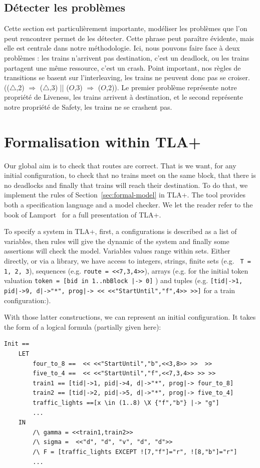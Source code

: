 \documentclass[runningheads]{llncs}
\begin{document}
\subsection{Détecter les problèmes}
Cette section est particulièrement importante, modéliser les problèmes que l'on peut rencontrer permet de les détecter.
Cette phrase peut paraître évidente, mais elle est centrale dans notre méthodologie. Ici, nous pouvons faire face à deux problèmes : 
les trains n'arrivent pas destination, c'est un deadlock, ou les trains partagent une même ressource, c'est un crash. 
Point important, nos règles de transitions se basent sur l'interleaving, les trains ne peuvent donc pas se croiser. (($\triangle$,2) $\Rightarrow$ ($\triangle$,3) || ($O$,3) $\Rightarrow$ ($O$,2)).
Le premier problème représente notre propriété de Liveness, les trains arrivent à destination, et le second représente notre propriété de Safety, les trains ne se crashent pas.

\section{Formalisation within TLA+}
\label{sec:tla-formalisation}

Our global aim is to check that routes are correct. That is we want, for any initial configuration, to check that no trains meet on the same block, that there is no deadlocks and finally  that trains will reach their destination. To do that, we implement the rules of Section~\ref{sec:formal-model} in TLA+. The tool provides both a specification language and a model checker. We let the reader refer to the book of Lamport~\cite{Lamport} for a full presentation of TLA+. 

To specify a system in TLA+, first, a configurations is described as a list of variables, then rules  will give the dynamic of the system and finally some assertions  will check the model.  Variables values range within sets. Either directly, or via a library, we have access to integers, strings, finite sets (e.g. \texttt{ T = {1, 2, 3}}), sequences (e.g. \texttt{route = <<7,3,4>>}),  arrays (e.g. for the initial token valuation \texttt{token = [bid in 1..nbBlock |-> 0]} ) and tuples (e.g. \texttt{[tid|->1, pid|->9, d|->"*", prog|-> << <<"StartUntil","f",4>> >>]}  for a train configuration:).

With those latter constructions, we can represent an initial configuration. It takes the form of a logical formula (partially given here):
\begin{verbatim}
Init == 
    LET 
        four_to_8 ==  << <<"StartUntil","b",<<3,8>> >>  >>
        five_to_4 ==  << <<"StartUntil","f",<<7,3,4>> >> >>
        train1 == [tid|->1, pid|->4, d|->"*", prog|-> four_to_8]
        train2 == [tid|->2, pid|->5, d|->"*", prog|-> five_to_4]
        traffic_lights ==[x \in (1..8) \X {"f","b"} |-> "g"]
        ...
    IN
        /\ gamma = <<train1,train2>>
        /\ sigma =  <<"d", "d", "v", "d", "d">> 
        /\ F = [traffic_lights EXCEPT ![7,"f"]="r", ![8,"b"]="r"]
        ...
\end{verbatim}
\end{document}
